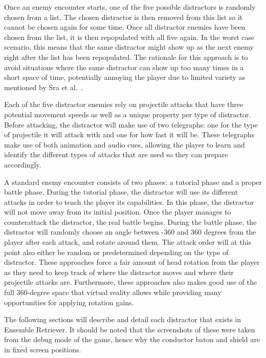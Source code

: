 Once an enemy encounter starts, one of the five possible distractors is randomly chosen from a list. The chosen distractor is then removed from this list so it cannot be chosen again for some time. Once all distractor enemies have been chosen from the list, it is then repopulated with all five again. In the worst case scenario, this means that the same distractor might show up as the next enemy right after the list has been repopulated. The rationale for this approach is to avoid situations where the same distractor can show up too many times in a short space of time, potentially annoying the player due to limited variety as mentioned by Sra et al.~\cite{sra2018vmotion}. 

Each of the five distractor enemies rely on projectile attacks that have three potential movement speeds as well as a unique property per type of distractor. Before attacking, the distractor will make use of two telegraphs: one for the type of projectile it will attack with and one for how fast it will be. These telegraphs make use of both animation and audio cues, allowing the player to learn and identify the different types of attacks that are used so they can prepare accordingly. 

A standard enemy encounter consists of two phases: a tutorial phase and a proper battle phase. During the tutorial phase, the distractor will use its different attacks in order to teach the player its capabilities. In this phase, the distractor will not move away from its initial position. Once the player manages to counterattack the distractor, the real battle begins. During the battle phase, the distractor will randomly choose an angle between -360 and 360 degrees from the player after each attack, and rotate around them. The attack order will at this point also either be random or predetermined depending on the type of distractor. These approaches force a fair amount of head rotation from the player as they need to keep track of where the distractor moves and where their projectile attacks are. Furthermore, these approaches also makes good use of the full 360-degree space that virtual reality allows while providing many opportunities for applying rotation gains.    

The following sections will describe and detail each distractor that exists in Ensemble Retriever. It should be noted that the screenshots of these were taken from the debug mode of the game, hence why the conductor baton and shield are in fixed screen positions.

